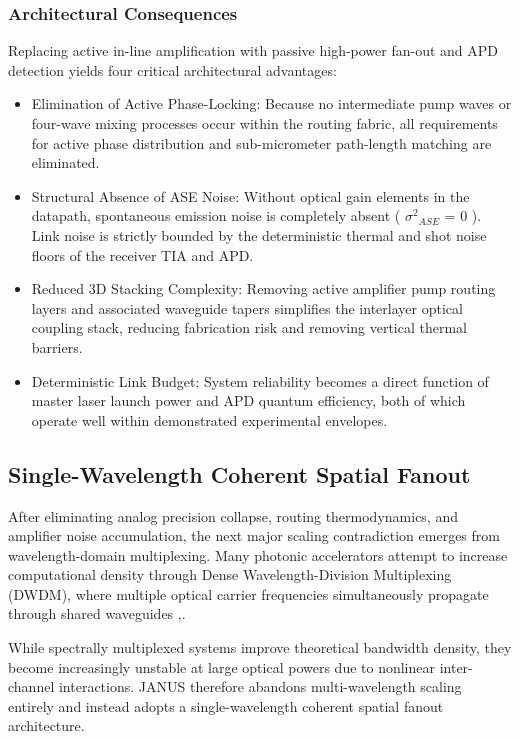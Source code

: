 \documentclass[journal]{IEEEtran}
\begin{document}
\subsubsection{\textbf{Architectural Consequences}}

Replacing active in-line amplification with passive high-power fan-out and APD detection yields four critical architectural advantages:

\begin{itemize}
\item Elimination of Active Phase-Locking: Because no intermediate pump waves or four-wave mixing processes occur within the routing fabric, all requirements for active phase distribution and sub-micrometer path-length matching are eliminated.
\item Structural Absence of ASE Noise: Without optical gain elements in the datapath, spontaneous emission noise is completely absent ( ${\sigma^{2}}_{ASE}$ = 0 ). Link noise is strictly bounded by the deterministic thermal and shot noise floors of the receiver TIA and APD.
\item Reduced 3D Stacking Complexity: Removing active amplifier pump routing layers and associated waveguide tapers simplifies the interlayer optical coupling stack, reducing fabrication risk and removing vertical thermal barriers.
\item Deterministic Link Budget: System reliability becomes a direct function of master laser launch power and APD quantum efficiency, both of which operate well within demonstrated experimental envelopes.
\end{itemize}

\subsection{\textbf{Single-Wavelength Coherent Spatial Fanout}}

After eliminating analog precision collapse, routing thermodynamics, and amplifier noise accumulation, the next major scaling contradiction emerges from wavelength-domain multiplexing. Many photonic accelerators attempt to increase computational density through Dense Wavelength-Division Multiplexing (DWDM), where multiple optical carrier frequencies simultaneously propagate through shared waveguides \cite{Cotter1999},\cite{Miscuglio2020}.

While spectrally multiplexed systems improve theoretical bandwidth density, they become increasingly unstable at large optical powers due to nonlinear inter-channel interactions. JANUS therefore abandons multi-wavelength scaling entirely and instead adopts a single-wavelength coherent spatial fanout architecture.
\end{document}
